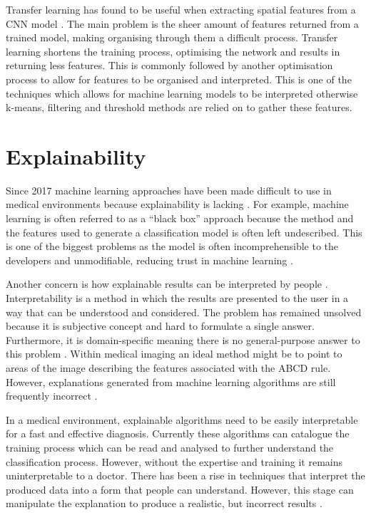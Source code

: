 \documentclass[12pt]{report}
\begin{document}
Transfer learning has found to be useful when extracting spatial features from a CNN model \cite{Akram2020}. The main problem is the sheer amount of features returned from a trained model, making organising through them a difficult process. Transfer learning shortens the training process, optimising the network and results in returning less features. This is commonly followed by another optimisation process to allow for features to be organised and interpreted. This is one of the techniques which allows for machine learning models to be interpreted otherwise k-means, filtering and threshold methods are relied on to gather these features.


\section{Explainability}
Since 2017 machine learning approaches have been made difficult to use in medical environments because explainability is lacking \cite{Holzinger2017}. For example, machine learning is often referred to as a “black box” approach because the method and the features used to generate a classification model is often left undescribed. This is one of the biggest problems as the model is often incomprehensible to the developers and unmodifiable, reducing trust in machine learning \cite{Monaco2019}.

Another concern is how explainable results can be interpreted by people \cite{Gilpin2018}. Interpretability is a method in which the results are presented to the user in a way that can be understood and considered. The problem has remained unsolved because it is subjective concept and hard to formulate a single answer. Furthermore, it is domain-specific meaning there is no general-purpose answer to this problem \cite{Carvalho2019}. Within medical imaging an ideal method might be to point to areas of the image describing the features associated with the ABCD rule. However, explanations generated from machine learning algorithms are still frequently incorrect \cite{Carvalho2019}. 

In a medical environment, explainable algorithms need to be easily interpretable for a fast and effective diagnosis. Currently these algorithms can catalogue the training process which can be read and analysed to further understand the classification process. However, without the expertise and training it remains uninterpretable to a doctor. There has been a rise in techniques that interpret the produced data into a form that people can understand. However, this stage can manipulate the explanation to produce a realistic, but incorrect results \cite{Ghorbani2019}. 
\end{document}

